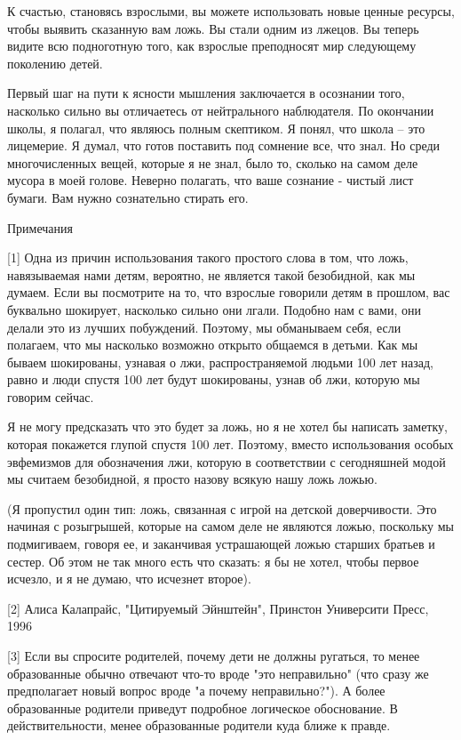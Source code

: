 \documentclass[ebook,12pt,oneside,openany]{memoir}
\begin{document}
К счастью, становясь взрослыми, вы можете использовать новые ценные
ресурсы, чтобы выявить сказанную вам ложь. Вы стали одним из лжецов.
Вы теперь видите всю подноготную того, как взрослые преподносят мир
следующему поколению детей.

Первый шаг на пути к ясности мышления заключается в осознании того,
насколько сильно вы отличаетесь от нейтрального наблюдателя. По
окончании школы, я полагал, что являюсь полным скептиком. Я понял, что
школа -- это лицемерие. Я думал, что готов поставить под сомнение все,
что знал. Но среди многочисленных вещей, которые я не знал, было то,
сколько на самом деле мусора в моей голове. Неверно полагать, что ваше
сознание - чистый лист бумаги. Вам нужно сознательно стирать его.

Примечания

[1] Одна из причин использования такого простого слова в том, что
ложь, навязываемая нами детям, вероятно, не является такой безобидной,
как мы думаем. Если вы посмотрите на то, что взрослые говорили детям в
прошлом, вас буквально шокирует, насколько сильно они лгали. Подобно
нам с вами, они делали это из лучших побуждений. Поэтому, мы
обманываем себя, если полагаем, что мы насколько возможно открыто
общаемся в детьми. Как мы бываем шокированы, узнавая о лжи,
распространяемой людьми 100 лет назад, равно и люди спустя 100 лет
будут шокированы, узнав об лжи, которую мы говорим сейчас.

Я не могу предсказать что это будет за ложь, но я не хотел бы написать
заметку, которая покажется глупой спустя 100 лет. Поэтому, вместо
использования особых эвфемизмов для обозначения лжи, которую в
соответствии с сегодняшней модой мы считаем безобидной, я просто
назову всякую нашу ложь ложью.

(Я пропустил один тип: ложь, связанная с игрой на детской
доверчивости. Это начиная с розыгрышей, которые на самом деле не
являются ложью, поскольку мы подмигиваем, говоря ее, и заканчивая
устрашающей ложью старших братьев и сестер. Об этом не так много есть
что сказать: я бы не хотел, чтобы первое исчезло, и я не думаю, что
исчезнет второе).

[2] Алиса Калапрайс, "Цитируемый Эйнштейн", Принстон Университи Пресс,
1996

[3] Если вы спросите родителей, почему дети не должны ругаться, то
менее образованные обычно отвечают что-то вроде "это неправильно" (что
сразу же предполагает новый вопрос вроде "а почему неправильно?"). А
более образованные родители приведут подробное логическое обоснование.
В действительности, менее образованные родители куда ближе к правде.
\end{document}
